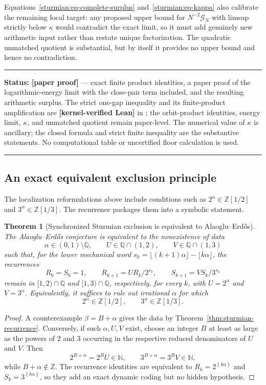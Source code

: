 \documentclass[11pt,oneside]{article}
\newtheorem{theorem}{Theorem}[section]
\theoremstyle{definition}
\theoremstyle{remark}
\newcommand{\N}{\mathbb N}
\newcommand{\Z}{\mathbb Z}
\newcommand{\Q}{\mathbb Q}
\newcommand{\fract}[1]{\left\{#1\right\}}
\newcommand{\lean}[1]{\texttt{\detokenize{#1}}}
\newcommand{\statuslean}{\textcolor{leanblue}{\textbf{[kernel-verified Lean]}}}
\newcommand{\statusnew}{\textcolor{newgreen}{\textbf{[paper proof]}}}
\newenvironment{statusbox}[1]
{\begin{center}\begin{minipage}{0.94\textwidth}\raggedright\hbadness=10000\hrule
\vspace{0.45em}\textbf{Status:} #1\par\vspace{0.35em}}
{\vspace{0.35em}\hrule\end{minipage}\end{center}}
\begin{document}
Equations~\eqref{sturmian:eq-complete-surplus} and~\eqref{sturmian:eq-kappa} also calibrate
the remaining local target: any proposed upper bound for $N^{-2}\mathcal G_N$ with limsup
strictly below $\kappa$ would contradict the exact limit, so it must add genuinely new
arithmetic input rather than
restate unique factorization.  The quadratic unmatched quotient is substantial, but by itself
it provides no upper bound and hence no contradiction.

\begin{statusbox}{\statusnew{} --- exact finite product identities, a paper proof of the
logarithmic-energy limit with the close-pair term included, and the resulting arithmetic
surplus.  The strict one-gap inequality and its finite-product amplification are
\statuslean{} in \lean{MatchedGapAmplification}; the orbit-product identities, energy limit,
$\kappa$, and unmatched quotient remain paper-level.  The numerical value of $\kappa$ is
ancillary; the closed formula and strict finite inequality are the substantive statements.
No computational table or uncertified floor calculation is used.}
\end{statusbox}

\subsection{An exact equivalent exclusion principle}

The localization reformulations above include conditions such as
$2^\alpha\in\Z[1/2]$ and $3^\alpha\in\Z[1/3]$.  The recurrence packages them into a symbolic
statement.

\begin{theorem}[Synchronized Sturmian exclusion is equivalent to Alaoglu--Erd\H{o}s]
\label{thm:sturmian-equivalence}
The Alaoglu--Erd\H{o}s conjecture is equivalent to the nonexistence of data
\[
  \alpha\in(0,1)\setminus\Q,
  \qquad
  U\in\Q\cap(1,2),
  \qquad
  V\in\Q\cap(1,3)
\]
such that, for the lower mechanical word
$s_k=\lfloor(k+1)\alpha\rfloor-\lfloor k\alpha\rfloor$, the recurrences
\[
  R_0=S_0=1,
  \qquad R_{k+1}=UR_k/2^{s_k},
  \qquad S_{k+1}=VS_k/3^{s_k}
\]
remain in $[1,2)\cap\Q$ and $[1,3)\cap\Q$, respectively, for every $k$, with
$U=2^\alpha$ and $V=3^\alpha$.
Equivalently, it suffices to rule out irrational $\alpha$ for which
\[
  2^\alpha\in\Z[1/2],
  \qquad
  3^\alpha\in\Z[1/3].
\]
\end{theorem}

\begin{proof}
A counterexample $\beta=B+\alpha$ gives the data by
Theorem~\ref{thm:sturmian-recurrence}.  Conversely, if such $\alpha,U,V$ exist, choose an
integer $B$ at least as large as the powers of $2$ and $3$ occurring in the respective
reduced denominators of $U$ and $V$.  Then
\[
  2^{B+\alpha}=2^BU\in\N,
  \qquad
  3^{B+\alpha}=3^BV\in\N,
\]
while $B+\alpha\notin\Z$.  The recurrence identities are equivalent to
$R_k=2^{\fract{k\alpha}}$ and $S_k=3^{\fract{k\alpha}}$, so they add an exact dynamic coding
but no hidden hypothesis.
\end{proof}
\end{document}

